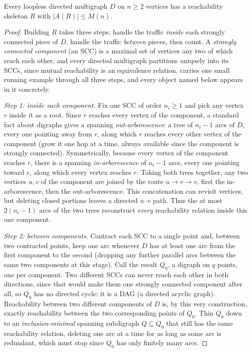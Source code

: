 \begin{lemma}\label{lem:reach-skeleton}
Every loopless directed multigraph $D$ on $n \ge 2$ vertices has a reachability skeleton $R$ with $|A(R)| \le M(n)$.
\end{lemma}

\begin{proof}
Building $R$ takes three steps: handle the traffic \emph{inside} each strongly connected piece of $D$, handle the traffic \emph{between} pieces, then count. A \emph{strongly connected component} (an SCC) is a maximal set of vertices any two of which reach each other, and every directed multigraph partitions uniquely into its SCCs, since mutual reachability is an equivalence relation.  carries one small running example through all three steps, and every object named below appears in it concretely.

\emph{Step 1: inside each component.} Fix one SCC of order $n_i \ge 1$ and pick any vertex $r$ inside it as a root. Since $r$ reaches every vertex of the component, a standard fact about digraphs gives a spanning \emph{out-arborescence}: a tree of $n_i - 1$ arcs of $D$, every one pointing away from $r$, along which $r$ reaches every other vertex of the component (grow it one hop at a time, always available since the component is strongly connected). Symmetrically, because every vertex of the component reaches $r$, there is a spanning \emph{in-arborescence} of $n_i - 1$ arcs, every one pointing toward $r$, along which every vertex reaches $r$. Taking both trees together, any two vertices $u, v$ of the component are joined by the route $u \to r \to v$, first the in-arborescence, then the out-arborescence. This concatenation can revisit vertices, but deleting closed portions leaves a directed $u$--$v$ path. Thus the at most $2(n_i - 1)$ arcs of the two trees reconstruct \emph{every} reachability relation inside this one component.

\emph{Step 2: between components.} Contract each SCC to a single point and, between two contracted points, keep one arc whenever $D$ has at least one arc from the first component to the second (dropping any further parallel arcs between the same two components at this stage). Call the result $Q_0$, a digraph on $q$ points, one per component. Two different SCCs can never reach each other in both directions, since that would make them one strongly connected component after all, so $Q_0$ has no directed cycle: it is a DAG (a directed acyclic graph). Reachability between two different components of $D$ is, by this very construction, exactly reachability between the two corresponding points of $Q_0$. Thin $Q_0$ down to an \emph{inclusion-minimal} spanning subdigraph $Q \subseteq Q_0$ that still has the same reachability relation, deleting one arc at a time for as long as some arc is redundant, which must stop since $Q_0$ has only finitely many arcs.


\end{proof}
